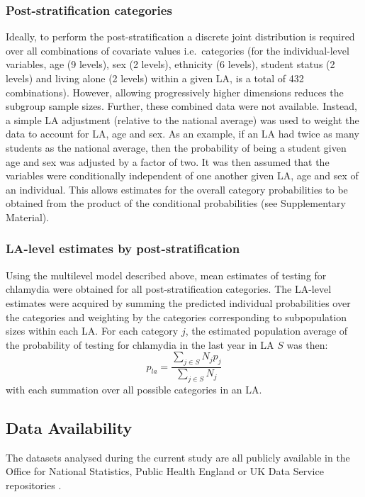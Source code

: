 \documentclass[fleqn,10pt]{wlscirep}
\begin{document}
\subsubsection*{Post-stratification categories}
Ideally, to perform the post-stratification a discrete joint distribution is required over all combinations of covariate values i.e.\ categories (for the individual-level variables, age (9 levels), sex (2 levels), ethnicity (6 levels), student status (2 levels) and living alone (2 levels) within a given LA, is a total of 432 combinations). However, allowing progressively higher dimensions reduces the subgroup sample sizes. Further, these combined data were not available. Instead, a simple LA adjustment (relative to the national average) was used to weight the data to account for LA, age and sex. As an example, if an LA had twice as many students as the national average, then the probability of being a student given age and sex was adjusted by a factor of two.
It was then assumed that the variables were conditionally independent of one another given LA, age and sex of an individual. This allows estimates for the overall category probabilities to be obtained from the product of the conditional probabilities (see Supplementary Material). 

\subsubsection*{LA-level estimates by post-stratification}
Using the multilevel model described above, mean estimates of testing for chlamydia were obtained for all post-stratification categories. The LA-level estimates were acquired by summing the predicted individual probabilities over the categories and weighting by the categories corresponding to subpopulation sizes within each LA.
For each category $j$, the estimated population average of the probability of testing for chlamydia in the last year in LA $S$ was then:
\begin{displaymath}
p_{la} = \frac{\sum_{j\in S} N_j p_j}{\sum_{j\in S} N_j}
\end{displaymath}
with each summation over all possible categories in an LA.

\subsection*{Data Availability}

The datasets analysed during the current study are all publicly available in the Office for National Statistics, Public Health England or UK Data Service repositories \cite{OfficeforNationalStatistics2011,OfficeforNationalStatistics2011a,DepartmentforCommunitiesandLocalGovernment,ONS_cesnsusdata,ONS_conceptions,ONS_urbanrural,PublicHealthEngland,Johnson2017}.
\end{document}
